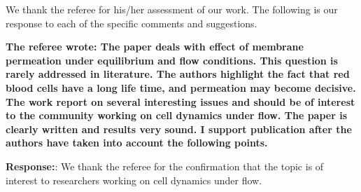 \documentclass[11pt]{article}
\begin{document}
We thank the referee for his/her assessment of our work.  
The following is
our response to each of the specific comments and suggestions.


{\bf The referee wrote:
The paper deals with effect of membrane permeation under equilibrium
and flow conditions. This question is rarely addressed in literature.
The authors highlight the fact that red blood cells have a long life
time, and permeation may become decisive. The work report on several
interesting issues and should be of interest to the community working
on cell dynamics under flow. The paper is clearly written and results
very sound. I support publication after the authors have taken into
account the following points.
}

\noindent
{\bf Response:}: We thank the referee for the confirmation that the topic is of interest to researchers working on cell dynamics under flow.
\end{document}

